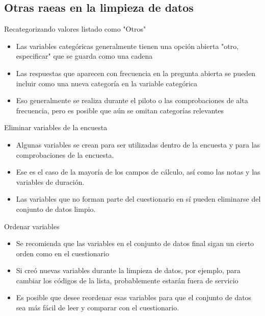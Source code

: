 \documentclass[10pt, aspectratio=169, compress]{beamer}
\begin{document}
\subsection{Otras raeas en la limpieza de datos}
\begin{frame}[t]{Recategorizando valores listado como "Otros"}
	\begin{itemize}
		\item Las variables categóricas generalmente tienen una opción abierta "otro, especificar" que se guarda como una cadena
		\item Las respuestas que aparecen con frecuencia en la pregunta abierta se pueden incluir como una nueva categoría en la variable categórica
		\item Eso generalmente se realiza durante el piloto o las comprobaciones de alta frecuencia, pero es posible que aún se omitan categorías relevantes
	\end{itemize}
\end{frame}
\begin{frame}[t]{Eliminar variables de la encuesta}
	\begin{itemize}
		\item Algunas variables se crean para ser utilizadas dentro de la encuesta y para las comprobaciones de la encuesta.
		\item Ese es el caso de la mayoría de los campos de cálculo, así como las notas y las variables de duración.
		\item Las variables que no forman parte del cuestionario en sí pueden eliminarse del conjunto de datos limpio.
	\end{itemize}
\end{frame}
\begin{frame}[t]{Ordenar variables}
	\begin{itemize}
		\item Se recomienda que las variables en el conjunto de datos final sigan un cierto orden como en el cuestionario
		\item Si creó nuevas variables durante la limpieza de datos, por ejemplo, para cambiar los códigos de la lista, probablemente estarán fuera de servicio
		\item Es posible que desee reordenar esas variables para que el conjunto de datos sea más fácil de leer y comparar con el cuestionario.
	\end{itemize}
\end{frame}
\end{document}
